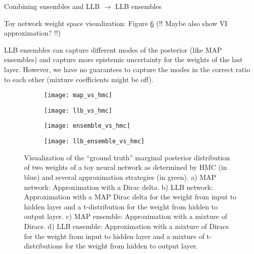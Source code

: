 \documentclass[../thesis.tex]{subfiles}
\begin{document}
Combining ensembles and LLB $\rightarrow$ LLB ensembles
\bigskip

Toy network weight space visualization: Figure \ref{fig:weight-space-approximations} (!! Maybe also show VI approximation? !!)
\bigskip

LLB ensembles can capture different modes of the posterior (like MAP ensembles) and capture more epistemic uncertainty for the weights of the last layer. However, we have no guarantees to capture the modes in the correct ratio to each other (mixture coefficients might be off). 

\begin{figure}[h!]
    \centering
    \begin{subfigure}{\textwidth}
    \texttt{[image: map\_vs\_hmc]} 
    \label{fig:subim1}
    \end{subfigure}

    \begin{subfigure}{\textwidth}
    \texttt{[image: llb\_vs\_hmc]}
    \label{fig:subim2}
    \end{subfigure}

    \begin{subfigure}{\textwidth}
    \texttt{[image: ensemble\_vs\_hmc]}
    \label{fig:subim3}
    \end{subfigure}

\end{figure}


\begin{figure}[h!]\ContinuedFloat
    \begin{subfigure}{\textwidth}
    \texttt{[image: llb\_ensemble\_vs\_hmc]}
    \label{fig:subim4}
    \end{subfigure}

    \caption{Visualization of the ``ground truth'' marginal posterior distribution of two weights of a toy neural network as determined by HMC (in blue) and several approximation strategies (in green). a) MAP network: Approximation with a Dirac delta. b) LLB network: Approximation with a MAP Dirac delta for the weight from input to hidden layer and a t-distribution for the weight from hidden to output layer. c) MAP ensemble: Approximation with a mixture of Diracs. d) LLB ensemble: Approximation with a mixture of Diracs for the weight from input to hidden layer and a mixture of t-distributions for the weight from hidden to output layer.}
    \label{fig:weight-space-approximations}
\end{figure}
\end{document}
